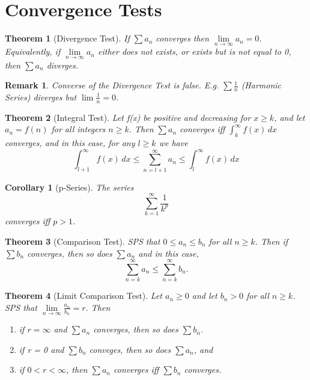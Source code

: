 \documentclass[11pt, oneside]{book}
\theoremstyle{break}
\newtheorem{thm}{Theorem}[section]
\newtheorem{crly}{Corollary}[thm]
\newtheorem*{remark}{Remark}
\begin{document}
\section{Convergence Tests}

\begin{thm}[Divergence Test]
	If $\sum a_n$ converges then $\lim\limits_{n \to \infty} a_n = 0$. Equivalently, if $\lim\limits_{n \to \infty} a_n$ either does not exists, or exists but is not equal to 0, then $\sum a_n$ diverges.
\end{thm}

\begin{remark}
	Converse of the Divergence Test is false. E.g. $\sum \frac{1}{n}$ (Harmonic Series) diverges but $\lim\limits \frac{1}{n} = 0$.
\end{remark}

\begin{thm}[Integral Test]
	Let f(x) be positive and decreasing for $x \geq k$, and let $a_n = f(n)$ for all integers $n \geq k$. Then $\sum a_n$ converges iff $\int_{k}^{\infty} f(x) \, dx$ converges, and in this case, for any $l \geq k$ we have
	\[
		\int_{l + 1}^{\infty} f(x) \, dx \leq \sum_{n = l + 1}^{\infty} a_n \leq \int_{l}^{\infty} f(x) \, dx
	\]
\end{thm}

\begin{crly}[p-Series]
	The series
	\[
		\sum_{k = 1}^{\infty} \frac{1}{k^p}
	\]
	converges iff $p > 1$.
\end{crly}

\begin{thm}[Comparison Test]
	SPS that $0 \leq a_n \leq b_n$ for all $n \geq k$. Then if $\sum b_n$ converges, then so does $\sum a_n$ and in this case,
	\[
		\sum_{n = k}^{\infty} a_n \leq \sum_{n = k}^{\infty} b_n.
	\]
\end{thm}

\begin{thm}[Limit Comparison Test]
	Let $a_n \geq 0$ and let $b_n > 0$ for all $n \geq k$. SPS that $\lim\limits_{n \to \infty} \frac{a_n}{b_n} = r$. Then
	\begin{enumerate}
		\item if $r = \infty$ and $\sum a_n$ converges, then so does $\sum b_n$.
		\item if r = 0 and $\sum b_n$ conveges, then so does $\sum a_n$, and
		\item if $0 < r < \infty$, then $\sum a_n$ converges iff $\sum b_n$ converges.
	\end{enumerate}
\end{thm}
\end{document}
